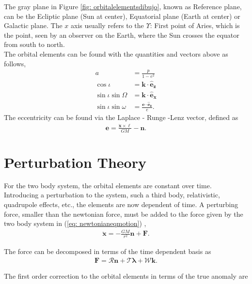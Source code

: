 The gray plane in Figure \ref{fig: orbitalelementsdibujo}, known as Reference plane, can be the Ecliptic plane (Sun at center), Equatorial plane (Earth at center) or Galactic plane. The $x$ axis usually refers to the $\Upsilon$: First point of Aries, which is the point, seen by an observer on the Earth, where the Sun crosses the equator from south to north. \cite{Clarke}\\

The orbital elements can be found with the quantities and vectors above as follows,
\begin{align}
a &= \frac{p}{1-e^2} \\
\cos \iota &= \mathbf{k} \cdot \mathbf{\hat{e}_z}\\
\sin \iota \sin \Omega &=  \mathbf{k} \cdot \mathbf{\hat{e}_x}\\
\sin \iota \sin \omega &=  \frac{\mathbf{e} \cdot \mathbf{\hat{e}_z}}{e}.
\end{align}
The eccentricity can be found via the Laplace - Runge -Lenz vector, defined as
\begin{align}
\mathbf{e} = \frac{\dot{\mathbf{x}}  \times \boldsymbol{\ell}}{GM} - \mathbf{n}.
\end{align}

\section{Perturbation Theory}

 For the two body system, the orbital elements are constant over time. Introducing a perturbation to the system, such a third body, relativistic, quadrupole effects, etc., the elements are now dependent of time. A perturbing force, smaller than the newtonian force, must be added to the force given by the two body system in (\ref{eq: newtonianeqmotion}) \cite{Brumberg, Sergeiclassical},
\begin{align}
	\ddot{\mathbf{x}} = -\frac{GM}{r^2} \mathbf{n} + \mathbf{F}.
\end{align}
 
The force can be decomposed in terms of the time dependent basis as
\begin{align}
	\mathbf{F} = \mathcal{R} \mathbf{n} + \mathcal{T} \boldsymbol{\lambda}+ \mathcal{W}\mathbf{k}.
\end{align}

The first order correction to the orbital elements in terms of the true anomaly are \cite{Brumberg, Larranaga}

